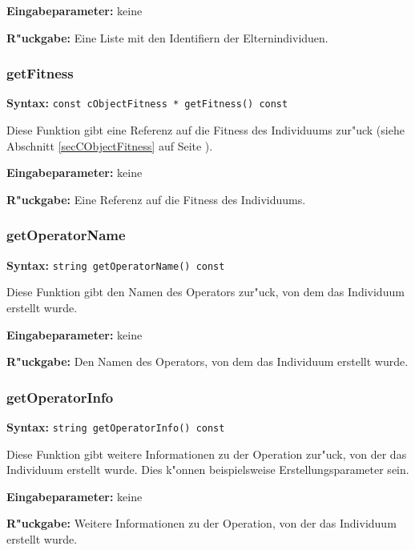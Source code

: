 \bigskip\noindent
\textbf{Eingabeparameter:} keine

\bigskip\noindent
\textbf{R"uckgabe:} Eine Liste mit den Identifiern der Elternindividuen.


\subsubsection{getFitness}

\textbf{Syntax:} \verb|const cObjectFitness * getFitness() const|

\bigskip\noindent
Diese Funktion gibt eine Referenz auf die Fitness des Individuums zur"uck (siehe Abschnitt \ref{secCObjectFitness} auf Seite \pageref{secCObjectFitness}).

\bigskip\noindent
\textbf{Eingabeparameter:} keine

\bigskip\noindent
\textbf{R"uckgabe:} Eine Referenz auf die Fitness des Individuums.


\subsubsection{getOperatorName}

\textbf{Syntax:} \verb|string getOperatorName() const|

\bigskip\noindent
Diese Funktion gibt den Namen des Operators zur"uck, von dem das Individuum erstellt wurde.

\bigskip\noindent
\textbf{Eingabeparameter:} keine

\bigskip\noindent
\textbf{R"uckgabe:} Den Namen des Operators, von dem das Individuum erstellt wurde.


\subsubsection{getOperatorInfo}

\textbf{Syntax:} \verb|string getOperatorInfo() const|

\bigskip\noindent
Diese Funktion gibt weitere Informationen zu der Operation zur"uck, von der das Individuum erstellt wurde. Dies k"onnen beispielsweise Erstellungsparameter sein.

\bigskip\noindent
\textbf{Eingabeparameter:} keine

\bigskip\noindent
\textbf{R"uckgabe:} Weitere Informationen zu der Operation, von der das Individuum erstellt wurde.


